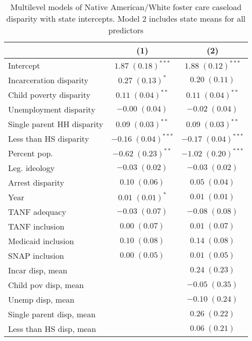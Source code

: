 
\begin{table}
\caption{Multilevel models of Native American/White foster care caseload disparity with state intercepts. Model 2 includes state means for all predictors }
\begin{center}
\begin{tabular}{l c c }
\hline
 & (1) & (2) \\
\hline
Intercept                  & $1.87 \; (0.18)^{***}$  & $1.88 \; (0.12)^{***}$  \\
Incarceration disparity    & $0.27 \; (0.13)^{*}$    & $0.20 \; (0.11)$        \\
Child poverty disparity    & $0.11 \; (0.04)^{**}$   & $0.11 \; (0.04)^{**}$   \\
Unemployment disparity     & $-0.00 \; (0.04)$       & $-0.02 \; (0.04)$       \\
Single parent HH disparity & $0.09 \; (0.03)^{**}$   & $0.09 \; (0.03)^{**}$   \\
Less than HS disparity     & $-0.16 \; (0.04)^{***}$ & $-0.17 \; (0.04)^{***}$ \\
Percent pop.               & $-0.62 \; (0.23)^{**}$  & $-1.02 \; (0.20)^{***}$ \\
Leg. ideology              & $-0.03 \; (0.02)$       & $-0.03 \; (0.02)$       \\
Arrest disparity           & $0.10 \; (0.06)$        & $0.05 \; (0.04)$        \\
Year                       & $0.01 \; (0.01)^{*}$    & $0.01 \; (0.01)$        \\
TANF adequacy              & $-0.03 \; (0.07)$       & $-0.08 \; (0.08)$       \\
TANF inclusion             & $0.00 \; (0.07)$        & $0.01 \; (0.07)$        \\
Medicaid inclusion         & $0.10 \; (0.08)$        & $0.14 \; (0.08)$        \\
SNAP inclusion             & $0.00 \; (0.05)$        & $0.01 \; (0.05)$        \\
Incar disp, mean           &                         & $0.24 \; (0.23)$        \\
Child pov disp, mean       &                         & $-0.05 \; (0.35)$       \\
Unemp disp, mean           &                         & $-0.10 \; (0.24)$       \\
Single parent disp, mean   &                         & $0.26 \; (0.22)$        \\
Less than HS disp, mean    &                         & $0.06 \; (0.21)$        \\

\end{tabular}
\end{center}
\end{table}
